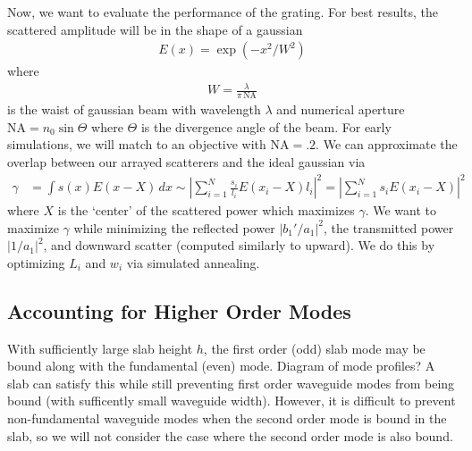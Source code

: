 \documentclass[10pt, letter, oneside,graphicx]{article}
\begin{document}
Now, we want to evaluate the performance of the grating. For best results, the scattered amplitude will be in the shape of a gaussian
\begin{align*}
E(x) = \exp(-x^2/W^2)
\end{align*}
where
\begin{align*}
W = \frac{\lambda}{\pi \, \text{NA}}
\end{align*}
is the waist of gaussian beam with wavelength $\lambda$ and numerical aperture $\text{NA} = n_0\sin\Theta$ where $\Theta$ is the divergence angle of the beam. For early simulations, we will match to an objective with $\text{NA} = .2$.
We can approximate the overlap between our arrayed scatterers and the ideal gaussian via
\begin{align*}
\gamma
&= \int s(x)E(x-X)\,dx
\sim \left| \sum_{i=1}^N \frac{s_i}{l_i}E(x_i-X)l_i \right|^2
= \left| \sum_{i=1}^N s_iE(x_i-X) \right|^2
\end{align*}
where $X$ is the `center' of the scattered power which maximizes $\gamma$.
We want to maximize $\gamma$ while minimizing the reflected power $|b_1'/a_1|^2$, the transmitted power $|1/a_1|^2$, and downward scatter (computed similarly to upward). We do this by optimizing $L_i$ and $w_i$ via simulated annealing.


\subsection{Accounting for Higher Order Modes}
With sufficiently large slab height $h$, the first order (odd) slab mode may be bound along with the fundamental (even) mode. Diagram of mode profiles? A slab can satisfy this while still preventing first order waveguide modes from being bound (with sufficently small waveguide width). However, it is difficult to prevent non-fundamental waveguide modes when the second order mode is bound in the slab, so we will not consider the case where the second order mode is also bound.
\end{document}
